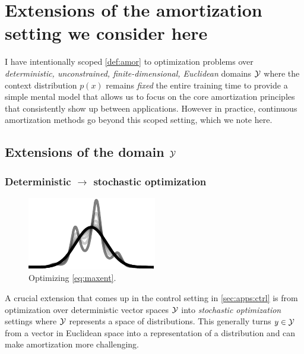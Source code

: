 \documentclass[twoside,11pt]{article}
\begin{document}
\section{Extensions of the amortization setting we consider here}
\label{sec:extensions}

I have intentionally scoped \cref{def:amor} to optimization problems
over \emph{deterministic, unconstrained, finite-dimensional, Euclidean}
domains ${\mathcal{Y}}$ where the context distribution $p(x)$
remains \emph{fixed} the
entire training time to provide a simple mental model that
allows us to focus on the core amortization principles
that consistently show up between applications.
However in practice, continuous amortization methods go
beyond this scoped setting, which we note here.

\subsection{Extensions of the domain ${\mathcal{Y}}$}
\label{sec:extensions:domain}
\subsubsection{Deterministic $\rightarrow$ stochastic optimization}
\label{sec:extensions:sto}
\begin{figure}
\vspace{-12mm}
\includegraphics[width=\linewidth]{fig/gaussian.pdf}
\caption{Optimizing \cref{eq:maxent}.}
\vspace{-3mm}
\end{figure}
A crucial extension that comes up in the control setting in
\cref{sec:apps:ctrl} is from optimization over deterministic vector
spaces ${\mathcal{Y}}$ into \emph{stochastic optimization} settings
where ${\mathcal{Y}}$ represents a space of distributions.
This generally turns $y\in{\mathcal{Y}}$ from a vector in Euclidean space
into a representation of a distribution and can make amortization
more challenging.
\end{document}
